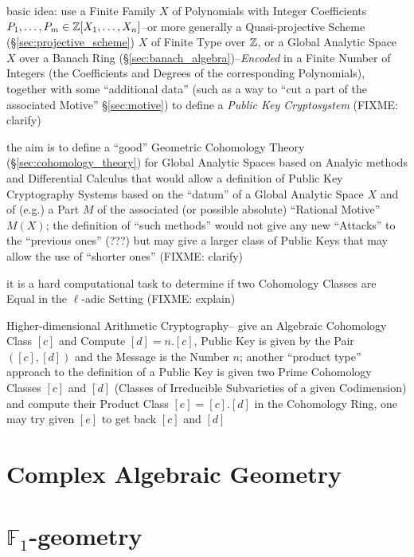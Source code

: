 \begin{itemize}
\begin{itemize}
basic idea: use a Finite Family $X$ of Polynomials with Integer Coefficients
$P_1, \ldots, P_m \in \mathbb{Z}[X_1, \ldots, X_n]$--or more generally a
Quasi-projective Scheme (\S\ref{sec:projective_scheme}) $X$ of Finite Type over
$\mathbb{Z}$, or a Global Analytic Space $X$ over a Banach Ring
(\S\ref{sec:banach_algebra})--\emph{Encoded} in a Finite Number of Integers
(the Coefficients and Degrees of the corresponding Polynomials), together with
some ``additional data'' (such as a way to ``cut a part of the associated
Motive'' \S\ref{sec:motive}) to define a \emph{Public Key Cryptosystem}
(FIXME: clarify)

the aim is to define a ``good'' Geometric Cohomology Theory
(\S\ref{sec:cohomology_theory}) for Global Analytic Spaces based on Analyic
methods and Differential Calculus that would allow a definition of Public Key
Cryptography Systems based on the ``datum'' of a Global Analytic Space $X$ and
of (e.g.) a Part $M$ of the associated (or possible absolute) ``Rational
Motive'' $M(X)$; the definition of ``such methods'' would not give any new
``Attacks'' to the ``previous ones'' (???) but may give a larger class of
Public Keys that may allow the use of ``shorter ones''
(FIXME: clarify)

it is a hard computational task to determine if two Cohomology Classes are
Equal in the $\ell$-adic Setting (FIXME: explain)

Higher-dimensional Arithmetic Cryptography-- give an Algebraic Cohomology Class
$[c]$ and Compute $[d] = n.[c]$, Public Key is given by the Pair $([c],[d])$
and the Message is the Number $n$; another ``product type'' approach to the
definition of a Public Key is given two Prime Cohomology Classes $[c]$ and
$[d]$ (Classes of Irreducible Subvarieties of a given Codimension) and compute
their Product Class $[e] = [c].[d]$ in the Cohomology Ring, one may try given
$[e]$ to get back $[c]$ and $[d]$



\section{Complex Algebraic Geometry}
\label{sec:complex_algebraic_geometry}

\section{$\mathbb{F}_1$-geometry}\label{sec:f1_geometry}


\end{itemize}
\end{itemize}
